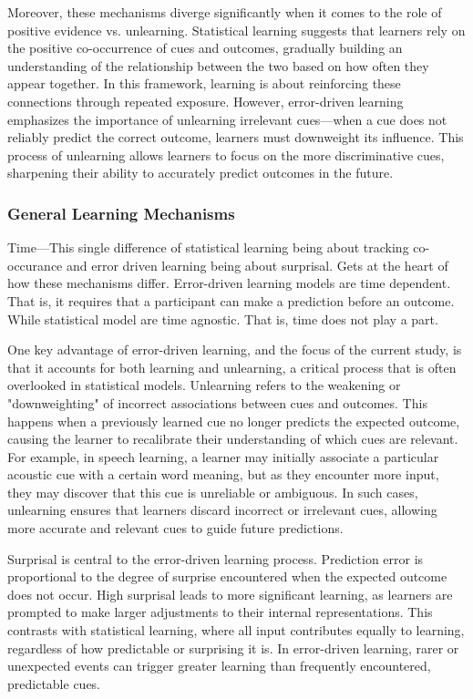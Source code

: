 Moreover, these mechanisms diverge significantly when it comes to the role of positive evidence vs. unlearning. Statistical learning suggests that learners rely on the positive co-occurrence of cues and outcomes, gradually building an understanding of the relationship between the two based on how often they appear together. In this framework, learning is about reinforcing these connections through repeated exposure. However, error-driven learning emphasizes the importance of unlearning irrelevant cues—when a cue does not reliably predict the correct outcome, learners must downweight its influence. This process of unlearning allows learners to focus on the more discriminative cues, sharpening their ability to accurately predict outcomes in the future.

\subsubsection{General Learning Mechanisms}
Time---This single difference of statistical learning being about tracking co-occurance and error driven learning being about surprisal. Gets at the heart of how these mechanisms differ. Error-driven learning models are time dependent. That is, it requires that a participant can make a prediction before an outcome. While statistical model are time agnostic. That is, time does not play a part. 


One key advantage of error-driven learning, and the focus of the current study, is that it accounts for both learning and unlearning, a critical process that is often overlooked in statistical models. Unlearning refers to the weakening or "downweighting" of incorrect associations between cues and outcomes. This happens when a previously learned cue no longer predicts the expected outcome, causing the learner to recalibrate their understanding of which cues are relevant. For example, in speech learning, a learner may initially associate a particular acoustic cue with a certain word meaning, but as they encounter more input, they may discover that this cue is unreliable or ambiguous. In such cases, unlearning ensures that learners discard incorrect or irrelevant cues, allowing more accurate and relevant cues to guide future predictions.

Surprisal is central to the error-driven learning process. Prediction error is proportional to the degree of surprise encountered when the expected outcome does not occur. High surprisal leads to more significant learning, as learners are prompted to make larger adjustments to their internal representations. This contrasts with statistical learning, where all input contributes equally to learning, regardless of how predictable or surprising it is. In error-driven learning, rarer or unexpected events can trigger greater learning than frequently encountered, predictable cues.

